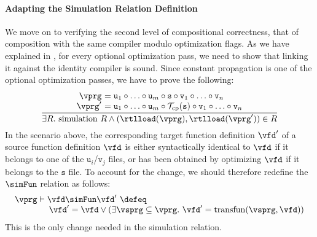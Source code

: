 \paragraph{Adapting the Simulation Relation Definition}

We move on to verifying the second level of compositional correctness, that of composition with the same compiler modulo optimization flags.
As we have explained in , for every optional optimization pass, we need to show that linking it against the identity compiler is sound.
Since constant propagation is one of the optional optimization passes, we have to prove the following:
\[
\frac{
\begin{array}{@{}r@{~}l@{}}
\vprg &= \mathtt{u}_1\circ \ldots \circ \mathtt{u}_m\circ\mathtt{s} \circ \mathtt{v}_1\circ \ldots \circ \mathtt{v}_n\\
\vprg' &= \mathtt{u}_1\circ \ldots \circ \mathtt{u}_m\circ\mathcal{T}_{\rm cp}(\mathtt{s}) \circ \mathtt{v}_1\circ \ldots \circ \mathtt{v}_n
\end{array}
}
{\exists R.~ \mathrm{simulation}~R \land 
(\rtlload(\vprg),\rtlload(\vprg'))\in R
}
\]
In the scenario above, the corresponding target function definition $\vfd'$ of a source function definition $\vfd$
is either syntactically identical to $\vfd$ if it belongs to one of the $\mathtt{u}_i$/$\mathtt{v}_j$ files, 
or has been obtained by optimizing $\vfd$ if it belongs to the $\mathtt{s}$ file.
To account for the change, we should therefore redefine the $\simFun$ relation as follows:
\[ 
\begin{array}{l}
\vprg \vdash \vfd \simFun \vfd' ~\defeq~ 
\\\qquad\qquad
\vfd' = \vfd \lor (\exists \vsprg \subseteq \vprg.~ \vfd' = \mathrm{transfun}(\vsprg,\vfd))
\end{array}
\]
This is the only change needed in the simulation relation.




